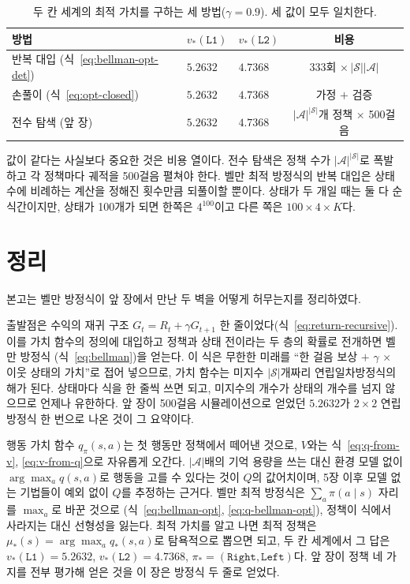 \documentclass[11pt,a4paper]{article}
\newcommand{\Sset}{\mathcal{S}}
\newcommand{\Aset}{\mathcal{A}}
\newcommand{\Lone}{\texttt{L1}}
\newcommand{\Ltwo}{\texttt{L2}}
\begin{document}
\begin{table}[htbp]
\centering
\caption{두 칸 세계의 최적 가치를 구하는 세 방법($\gamma=0.9$). 세 값이 모두 일치한다.}
\label{tab:three-methods}
\small
\begin{tabular}{@{}lllc@{}}
\toprule
방법 & $v_*(\Lone)$ & $v_*(\Ltwo)$ & 비용 \\
\midrule
반복 대입 (식~\eqref{eq:bellman-opt-det})   & $5.2632$ & $4.7368$ & 333회 $\times\,|\Sset||\Aset|$ \\
손풀이 (식~\eqref{eq:opt-closed}) & $5.2632$ & $4.7368$ & 가정 $+$ 검증 \\
전수 탐색 (앞 장) & $5.2632$ & $4.7368$ & $|\Aset|^{|\Sset|}$개 정책 $\times$ 500걸음 \\
\bottomrule
\end{tabular}
\end{table}

값이 같다는 사실보다 중요한 것은 비용 열이다. 전수 탐색은 정책 수가 $|\Aset|^{|\Sset|}$로 폭발하고 각
정책마다 궤적을 500걸음 펼쳐야 한다. 벨만 최적 방정식의 반복 대입은 상태 수에 비례하는 계산을 정해진
횟수만큼 되풀이할 뿐이다. 상태가 두 개일 때는 둘 다 순식간이지만, 상태가 100개가 되면 한쪽은
$4^{100}$이고 다른 쪽은 $100\times4\times K$다.

\section{정리}
\label{sec:summary}

본고는 벨만 방정식이 앞 장에서 만난 두 벽을 어떻게 허무는지를 정리하였다.

출발점은 수익의 재귀 구조 $G_t=R_t+\gamma G_{t+1}$ 한 줄이었다(식~\eqref{eq:return-recursive}). 이를
가치 함수의 정의에 대입하고 정책과 상태 전이라는 두 층의 확률로 전개하면 벨만 방정식
(식~\eqref{eq:bellman})을 얻는다. 이 식은 무한한 미래를 ``한 걸음 보상 $+$ $\gamma\,\times$ 이웃 상태의
가치''로 접어 넣으므로, 가치 함수는 미지수 $|\Sset|$개짜리 연립일차방정식의 해가 된다. 상태마다 식을
한 줄씩 쓰면 되고, 미지수의 개수가 상태의 개수를 넘지 않으므로 언제나 유한하다. 앞 장이 500걸음
시뮬레이션으로 얻었던 $5.2632$가 $2\times2$ 연립방정식 한 번으로 나온 것이 그 요약이다.

행동 가치 함수 $q_\pi(s,a)$는 첫 행동만 정책에서 떼어낸 것으로, $V$와는 식~\eqref{eq:q-from-v},
\eqref{eq:v-from-q}으로 자유롭게 오간다. $|\Aset|$배의 기억 용량을 쓰는 대신 환경 모델 없이
$\arg\max_a q(s,a)$로 행동을 고를 수 있다는 것이 $Q$의 값어치이며, 5장 이후 모델 없는 기법들이 예외 없이
$Q$를 추정하는 근거다. 벨만 최적 방정식은 $\sum_a\pi(a\mid s)$ 자리를 $\max_a$로 바꾼 것으로
(식~\eqref{eq:bellman-opt}, \eqref{eq:q-bellman-opt}), 정책이 식에서 사라지는 대신 선형성을 잃는다.
최적 가치를 알고 나면 최적 정책은 $\mu_*(s)=\arg\max_a q_*(s,a)$로 탐욕적으로 뽑으면 되고, 두 칸 세계에서
그 답은 $v_*(\Lone)=5.2632$, $v_*(\Ltwo)=4.7368$, $\pi_*=(\texttt{Right},\texttt{Left})$다. 앞 장이 정책
네 가지를 전부 평가해 얻은 것을 이 장은 방정식 두 줄로 얻었다.
\end{document}
